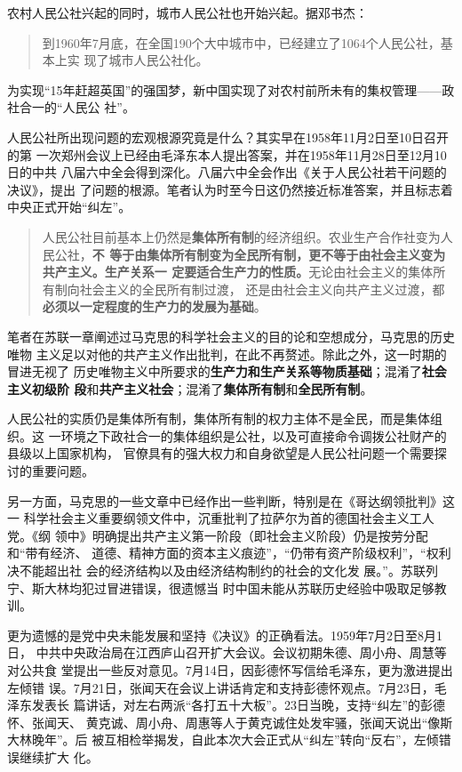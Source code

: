 农村人民公社兴起的同时，城市人民公社也开始兴起。据邓书杰：
\begin{quotation}
  到1960年7月底，在全国190个大中城市中，已经建立了1064个人民公社，基本上实
  现了城市人民公社化。
\end{quotation}

为实现“15年赶超英国”的强国梦，新中国实现了对农村前所未有的集权管理——政社合一的“人民公
社”。

人民公社所出现问题的宏观根源究竟是什么？其实早在1958年11月2日至10日召开的第
一次郑州会议上已经由毛泽东本人提出答案，并在1958年11月28日至12月10日的中共
八届六中全会得到深化。八届六中全会作出《关于人民公社若干问题的决议》，提出
了问题的根源。笔者认为时至今日这仍然接近标准答案，并且标志着中央正式开始“纠左”。
\begin{quotation}
  人民公社目前基本上仍然是\textbf{集体所有制}的经济组织。农业生产合作社变为人民公社，\textbf{不
  等于由集体所有制变为全民所有制，更不等于由社会主义变为共产主义。生产关系一
  定要适合生产力的性质。}无论由社会主义的集体所有制向社会主义的全民所有制过渡，
  还是由社会主义向共产主义过渡，都\textbf{必须以一定程度的生产力的发展为基础}。
\end{quotation}

笔者在苏联一章阐述过马克思的科学社会主义的目的论和空想成分，马克思的历史唯物
主义足以对他的共产主义作出批判，在此不再赘述。除此之外，这一时期的冒进无视了
历史唯物主义中所要求的\textbf{生产力和生产关系等物质基础}；混淆了\textbf{社会主义初级阶
  段}和\textbf{共产主义社会}；混淆了\textbf{集体所有制}和\textbf{全民所有制}。

人民公社的实质仍是集体所有制，集体所有制的权力主体不是全民，而是集体组织。这
一环境之下政社合一的集体组织是公社，以及可直接命令调拨公社财产的县级以上国家机构，
官僚具有的强大权力和自身欲望是人民公社问题一个需要探讨的重要问题。

另一方面，马克思的一些文章中已经作出一些判断，特别是在《哥达纲领批判》这一
科学社会主义重要纲领文件中，沉重批判了拉萨尔为首的德国社会主义工人党。《纲
领中》明确提出共产主义第一阶段（即社会主义阶段）仍是按劳分配和“带有经济、
道德、精神方面的资本主义痕迹”，“仍带有资产阶级权利”，“权利决不能超出社
会的经济结构以及由经济结构制约的社会的文化发
展。”。\cite[435]{maenwen3}苏联列宁、斯大林均犯过冒进错误，很遗憾当
时中国未能从苏联历史经验中吸取足够教训。

更为遗憾的是党中央未能发展和坚持《决议》的正确看法。1959年7月2日至8月1日，
中共中央政治局在江西庐山召开扩大会议。会议初期朱德、周小舟、周慧等对公共食
堂提出一些反对意见。7月14日，因彭德怀写信给毛泽东，更为激进提出左倾错
误。7月21日，张闻天在会议上讲话肯定和支持彭德怀观点。7月23日，毛泽东发表长
篇讲话，对左右两派“各打五十大板”。23日当晚，支持“纠左”的彭德怀、张闻天、
黄克诚、周小舟、周惠等人于黄克诚住处发牢骚，张闻天说出“像斯大林晚年”。后
被互相检举揭发，自此本次大会正式从“纠左”转向“反右”，左倾错误继续扩大
化。

